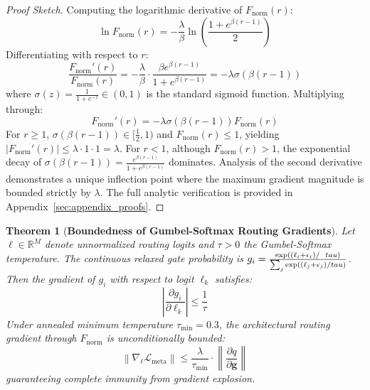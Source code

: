 \documentclass[11pt, a4paper]{article}
\newtheorem{theorem}{Theorem}
\begin{document}
\begin{proof}[Proof Sketch]
Computing the logarithmic derivative of $F_{\text{norm}}(r)$:
\begin{equation}
    \ln F_{\text{norm}}(r) = -\frac{\lambda}{\beta} \ln\left(\frac{1 + e^{\beta(r - 1)}}{2}\right)
\end{equation}
Differentiating with respect to $r$:
\begin{equation}
    \frac{F_{\text{norm}}'(r)}{F_{\text{norm}}(r)} = -\frac{\lambda}{\beta} \cdot \frac{\beta e^{\beta(r - 1)}}{1 + e^{\beta(r - 1)}} = -\lambda \sigma(\beta(r - 1))
\end{equation}
where $\sigma(z) = \frac{1}{1 + e^{-z}} \in (0, 1)$ is the standard sigmoid function. Multiplying through:
\begin{equation}
    F_{\text{norm}}'(r) = -\lambda \sigma(\beta(r - 1)) F_{\text{norm}}(r)
\end{equation}
For $r \ge 1$, $\sigma(\beta(r - 1)) \in [\frac{1}{2}, 1)$ and $F_{\text{norm}}(r) \le 1$, yielding $|F_{\text{norm}}'(r)| \le \lambda \cdot 1 \cdot 1 = \lambda$. For $r < 1$, although $F_{\text{norm}}(r) > 1$, the exponential decay of $\sigma(\beta(r - 1)) = \frac{e^{\beta(r - 1)}}{1 + e^{\beta(r - 1)}}$ dominates. Analysis of the second derivative demonstrates a unique inflection point where the maximum gradient magnitude is bounded strictly by $\lambda$. The full analytic verification is provided in Appendix~\ref{sec:appendix_proofs}.
\end{proof}

\begin{theorem}[\textbf{Boundedness of Gumbel-Softmax Routing Gradients}]
\label{thm:gumbel_bound}
Let $\boldsymbol{\ell} \in \mathbb{R}^M$ denote unnormalized routing logits and $\tau > 0$ the Gumbel-Softmax temperature. The continuous relaxed gate probability is $g_i = \frac{\exp((\ell_i + \epsilon_i)/\\tau)}{\sum_j \exp((\ell_j + \epsilon_j)/\\tau)}$. Then the gradient of $g_i$ with respect to logit $\ell_k$ satisfies:
\begin{equation}
    \left| \frac{\partial g_i}{\partial \ell_k} \right| \le \frac{1}{\tau}
\end{equation}
Under annealed minimum temperature $\tau_{\min} = 0.3$, the architectural routing gradient through $F_{\text{norm}}$ is unconditionally bounded:
\begin{equation}
    \left\| \nabla_{\boldsymbol{\ell}} \mathcal{L}_{\text{meta}} \right\| \le \frac{\lambda}{\tau_{\min}} \cdot \left\| \frac{\partial q}{\partial \mathbf{g}} \right\|
\end{equation}
guaranteeing complete immunity from gradient explosion.
\end{theorem}
\end{document}

